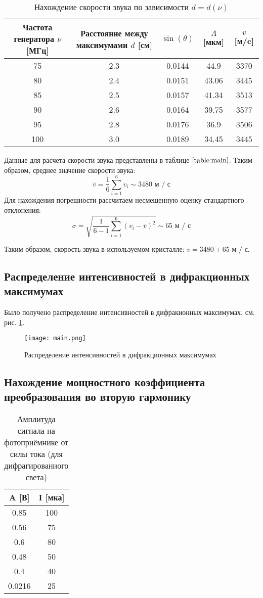 \documentclass[a4paper, 12pt]{extarticle}
\begin{document}
\begin{table}[hbtp]
    \centering
\begin{tabular}{|c|c|c|c|c|}
    \hline
Частота генератора $\nu$ [МГц]& Расстояние между максимумами $d$ [см]&$\sin(\theta)$&$\Lambda$ [мкм]&$v$ [м/c]\\
\hline
75&2.3&0.0144&44.9&3370\\
80&2.4&0.0151&43.06&3445\\
85&2.5&0.0157&41.34&3513\\
90&2.6&0.0164&39.75&3577\\
95&2.8&0.0176&36.9&3506\\
100&3.0&0.0189&34.45&3445\\
\hline
\end{tabular}
\label{table:main}
\caption{Нахождение скорости звука по зависимости $d = d(\nu)$}
\end{table}

Данные для расчета скорости звука представлены в таблице $\ref{table:main}$. Таким образом, среднее значение скорости звука:
$$
\overline{v} = \frac{1}{6} \sum_{i = 1}^{6} v_{i} \sim 3480 \text{ м / с}
$$
Для нахождения погрешности рассчитаем несмещенную оценку стандартного отклонения:
$$
\sigma = \sqrt{\frac{1}{6 - 1} \sum_{i = 1}^{6} (v_{i} - \overline{v})^{2}} \sim 65 \text{ м / с} 
$$

Таким образом, скорость звука в используемом кристалле: \underline{$v = 3480 \pm 65 \text{ м / с}$}.

\subsection*{\textcolor{sub_header}{Распределение интенсивностей в дифракционных максимумах}}

Было получено распределение интенсивностей в дифракионных максимумах, см. рис. \ref{fig:intensuty}.

\begin{figure}[htbp]
    \centering
    \texttt{[image: main.png]}
    \caption{Распределение интенсивностей в дифракционных максимумах}
    \label{fig:intensuty}
\end{figure}

\subsection*{\textcolor{sub_header}{Нахождение мощностного коэффициента преобразования во вторую гармонику}}


\begin{table}[hbtp]
    \centering
\begin{tabular}{|c|c|}
    \hline
A [В]&I [мка]\\
\hline
0.85&100\\
0.56&75\\
0.6&80\\
0.48&50\\
0.4&40\\
0.0216&25\\
\hline
\end{tabular}
\label{table:diff}
\caption{Амплитуда сигнала на фотоприёмнике от силы тока (для дифрагированного света)}
\end{table}
\end{document}
